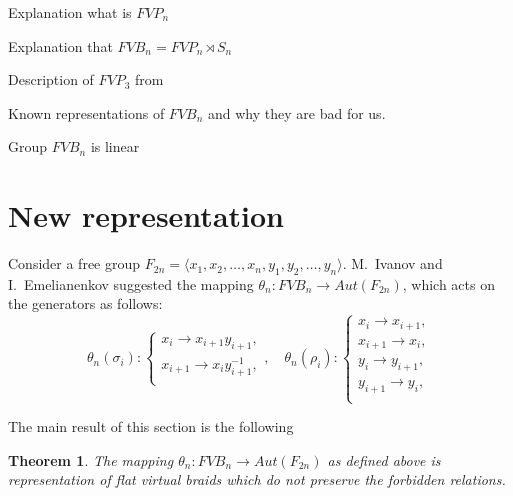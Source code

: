 \documentclass{article}
\newtheorem{theorem}{Theorem}
\begin{document}
Explanation what is $FVP_n$

Explanation that $FVB_n=FVP_n\rtimes S_n$

Description of $FVP_3$ from \cite{BarBelDom}

Known representations of $FVB_n$ and why they are bad for us.

Group $FVB_n$ is linear \cite{BarBelDom}
\section{New representation}

Consider a free group $F_{2n}=\langle x_1, x_2,\ldots , x_n, y_1, y_2, \ldots , y_n \rangle$. M.~Ivanov and I.~Emelianenkov suggested the mapping $\theta_n:FVB_n \rightarrow Aut(F_{2n})$, which acts on the generators as follows:
$$
\theta_n(\sigma_i):
\begin{cases}
x_i \rightarrow x_{i+1}y_{i+1},\\
x_{i+1} \rightarrow x_iy_{i+1}^{-1},\\
\end{cases},\quad
\theta_n(\rho_i):
\begin{cases}
x_i \rightarrow x_{i+1},\\
x_{i+1} \rightarrow x_i,\\
y_i \rightarrow y_{i+1},\\
y_{i+1} \rightarrow y_i,\\
\end{cases}
$$

The main result of this section is the following

\begin{theorem}
The mapping $\theta_n:FVB_n \rightarrow Aut(F_{2n})$ as defined above is representation of flat virtual braids which do not preserve the forbidden relations.
\end{theorem} 
\end{document}
